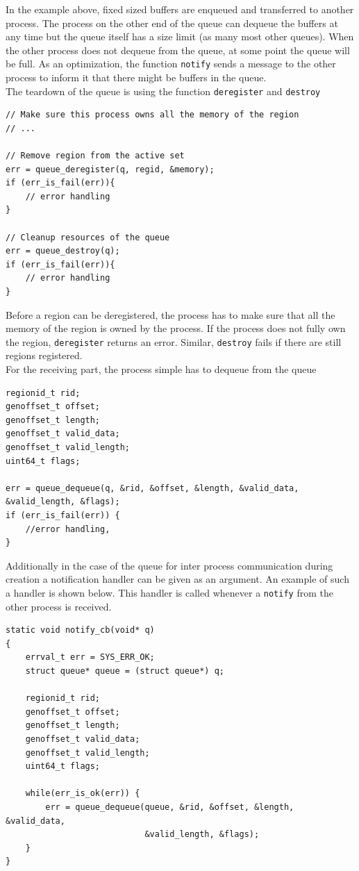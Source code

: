 \documentclass[a4paper,11pt,twoside]{report}
\begin{document}
In the example above, fixed sized buffers are enqueued and transferred to another process. 
The process on the other end of the queue can dequeue the buffers at any time but the queue
itself has a size limit (as many most other queues). When the other process does not dequeue
from the queue, at some point the queue will be full. As an optimization, the function \texttt{notify}
sends a message to the other process to inform it that there might be buffers in the queue. 
\\
The teardown of the queue is using the function \texttt{deregister} and \texttt{destroy}
\begin{lstlisting}[style=code]
// Make sure this process owns all the memory of the region
// ...

// Remove region from the active set
err = queue_deregister(q, regid, &memory);
if (err_is_fail(err)){
    // error handling
}

// Cleanup resources of the queue
err = queue_destroy(q);
if (err_is_fail(err)){
    // error handling
}
\end{lstlisting}
Before a region can be deregistered, the process has to make sure that all the memory of the region
is owned by the process. If the process does not fully own the region, \texttt{deregister} 
returns an error. Similar, \texttt{destroy} fails if there are still regions registered. 
\\
For the receiving part, the process simple has to dequeue from the queue
\begin{lstlisting}[style=code]
regionid_t rid;
genoffset_t offset;
genoffset_t length;
genoffset_t valid_data;
genoffset_t valid_length;
uint64_t flags;

err = queue_dequeue(q, &rid, &offset, &length, &valid_data, &valid_length, &flags);
if (err_is_fail(err)) {
    //error handling, 
}
\end{lstlisting}
Additionally in the case of the queue for inter process communication during creation
a notification handler can be given as an argument. An example of such a handler is shown below.
This handler is called whenever a \texttt{notify} from the other process is received. 
\begin{lstlisting}[style=code]
static void notify_cb(void* q)
{
    errval_t err = SYS_ERR_OK;
    struct queue* queue = (struct queue*) q;

    regionid_t rid;
    genoffset_t offset;
    genoffset_t length;
    genoffset_t valid_data;
    genoffset_t valid_length;
    uint64_t flags;

    while(err_is_ok(err)) {
        err = queue_dequeue(queue, &rid, &offset, &length, &valid_data,
                            &valid_length, &flags);
    }
}
\end{lstlisting}
\end{document}
